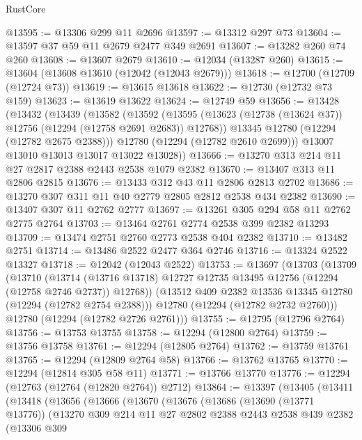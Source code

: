 \begin{lexlean}{RustCore}
\begin{coremodule}
@13595 := @13306 @299 @11 @2696
@13597 := @13312 @297 @73
@13604 := @13597 @37 @59 @11 @2679 @2477 @349 @2691
@13607 := @13282 @260 @74 @260
@13608 := @13607 @2679
@13610 := @12034 (@13287 @260)
@13615 := @13604 (@13608 @13610 (@12042 (@12043 @2679)))
@13618 := @12700 (@12709 (@12724 @73))
@13619 := @13615 @13618
@13622 := @12730 (@12732 @73 @159)
@13623 := @13619 @13622
@13624 := @12749 @59
@13656 := @13428
    (@13432
      (@13439
        (@13582
          (@13592
            (@13595 (@13623 (@12738 (@13624 @37)) @12756 (@12294 (@12758 @2691 @2683)) @12768))
            @13345
            @12780
            (@12294 (@12782 @2675 @2388)))
          @12780
          (@12294 (@12782 @2610 @2699)))
        @13007
        @13010
        @13013
        @13017
        @13022
        @13028))
@13666 := @13270 @313 @214 @11 @27 @2817 @2388 @2443 @2538 @1079 @2382
@13670 := @13407 @313 @11 @2806 @2815
@13676 := @13433 @312 @43 @11 @2806 @2813 @2702
@13686 := @13270 @307 @311 @11 @40 @2779 @2805 @2812 @2538 @434 @2382
@13690 := @13407 @307 @11 @2762 @2777
@13697 := @13261 @305 @294 @58 @11 @2762 @2775 @2764
@13703 := @13464 @2761 @2774 @2538 @399 @2382 @13293
@13709 := @13474 @2751 @2760 @2773 @2538 @404 @2382
@13710 := @13482 @2751
@13714 := @13486 @2522 @2477 @364 @2746
@13716 := @13324 @2522 @13327
@13718 := @12042 (@12043 @2522)
@13753 := @13697
    (@13703
      (@13709
        (@13710
          (@13714 (@13716 @13718) @12727 @12735 @13495 @12756 (@12294 (@12758 @2746 @2737)) @12768))
        (@13512 @409 @2382 @13536 @13345 @12780 (@12294 (@12782 @2754 @2388)))
        @12780
        (@12294 (@12782 @2732 @2760)))
      @12780
      (@12294 (@12782 @2726 @2761)))
@13755 := @12795 (@12796 @2764)
@13756 := @13753 @13755
@13758 := @12294 (@12800 @2764)
@13759 := @13756 @13758
@13761 := @12294 (@12805 @2764)
@13762 := @13759 @13761
@13765 := @12294 (@12809 @2764 @58)
@13766 := @13762 @13765
@13770 := @12294 (@12814 @305 @58 @11)
@13771 := @13766 @13770
@13776 := @12294 (@12763 (@12764 (@12820 @2764)) @2712)
@13864 := @13397
    (@13405
      (@13411
        (@13418
          (@13656
            (@13666
              (@13670
                (@13676
                  (@13686
                    (@13690 (@13771 @13776))
                    (@13270
                      @309
                      @214
                      @11
                      @27
                      @2802
                      @2388
                      @2443
                      @2538
                      @439
                      @2382
                      (@13306
                        @309

\end{coremodule}
\end{lexlean}
